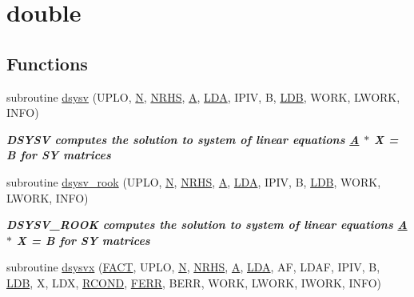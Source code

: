 \hypertarget{group__doubleSYsolve}{}\section{double}
\label{group__doubleSYsolve}
\subsection*{Functions}
\begin{DoxyCompactItemize}
\item 
subroutine \hyperlink{group__doubleSYsolve_ga9995c47692c9885ed5d6a6b431686f41}{dsysv} (U\+P\+L\+O, \hyperlink{polmisc_8c_a0240ac851181b84ac374872dc5434ee4}{N}, \hyperlink{example__user_8c_aa0138da002ce2a90360df2f521eb3198}{N\+R\+H\+S}, \hyperlink{classA}{A}, \hyperlink{example__user_8c_ae946da542ce0db94dced19b2ecefd1aa}{L\+D\+A}, I\+P\+I\+V, B, \hyperlink{example__user_8c_a50e90a7104df172b5a89a06c47fcca04}{L\+D\+B}, W\+O\+R\+K, L\+W\+O\+R\+K, I\+N\+F\+O)
\begin{DoxyCompactList}\small\item\em {\bfseries  D\+S\+Y\+S\+V computes the solution to system of linear equations \hyperlink{classA}{A} $\ast$ X = B for S\+Y matrices} \end{DoxyCompactList}\item 
subroutine \hyperlink{group__doubleSYsolve_ga1b3fcf55f485dd01efeb8435dccf9215}{dsysv\+\_\+rook} (U\+P\+L\+O, \hyperlink{polmisc_8c_a0240ac851181b84ac374872dc5434ee4}{N}, \hyperlink{example__user_8c_aa0138da002ce2a90360df2f521eb3198}{N\+R\+H\+S}, \hyperlink{classA}{A}, \hyperlink{example__user_8c_ae946da542ce0db94dced19b2ecefd1aa}{L\+D\+A}, I\+P\+I\+V, B, \hyperlink{example__user_8c_a50e90a7104df172b5a89a06c47fcca04}{L\+D\+B}, W\+O\+R\+K, L\+W\+O\+R\+K, I\+N\+F\+O)
\begin{DoxyCompactList}\small\item\em {\bfseries  D\+S\+Y\+S\+V\+\_\+\+R\+O\+O\+K computes the solution to system of linear equations \hyperlink{classA}{A} $\ast$ X = B for S\+Y matrices} \end{DoxyCompactList}\item 
subroutine \hyperlink{group__doubleSYsolve_ga183787a5a4cb471abe442815b0e44b35}{dsysvx} (\hyperlink{superlu__enum__consts_8h_af00a42ecad444bbda75cde1b64bd7e72a1b6692b56d378abb85bd49063721d034}{F\+A\+C\+T}, U\+P\+L\+O, \hyperlink{polmisc_8c_a0240ac851181b84ac374872dc5434ee4}{N}, \hyperlink{example__user_8c_aa0138da002ce2a90360df2f521eb3198}{N\+R\+H\+S}, \hyperlink{classA}{A}, \hyperlink{example__user_8c_ae946da542ce0db94dced19b2ecefd1aa}{L\+D\+A}, A\+F, L\+D\+A\+F, I\+P\+I\+V, B, \hyperlink{example__user_8c_a50e90a7104df172b5a89a06c47fcca04}{L\+D\+B}, X, L\+D\+X, \hyperlink{superlu__enum__consts_8h_af00a42ecad444bbda75cde1b64bd7e72a9b5c151728d8512307565994c89919d5}{R\+C\+O\+N\+D}, \hyperlink{superlu__enum__consts_8h_af00a42ecad444bbda75cde1b64bd7e72a78fd14d7abebae04095cfbe02928f153}{F\+E\+R\+R}, B\+E\+R\+R, W\+O\+R\+K, L\+W\+O\+R\+K, I\+W\+O\+R\+K, I\+N\+F\+O)

\end{DoxyCompactItemize}
